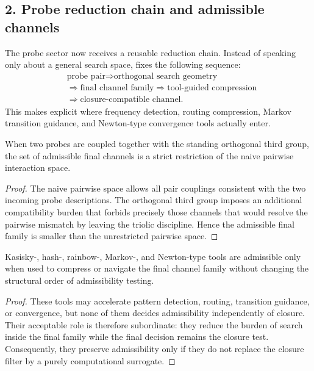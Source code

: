 \subsection*{2. Probe reduction chain and admissible channels}
The probe sector now receives a reusable reduction chain. Instead of speaking
only about a general search space,  fixes the following sequence:
\[
\begin{aligned}
&\text{probe pair}
\Longrightarrow \text{orthogonal search geometry}\\[0.15em]
&\Longrightarrow \text{final channel family}
\Longrightarrow \text{tool-guided compression}\\[0.15em]
&\Longrightarrow \text{closure-compatible channel}.
\end{aligned}
\]
This makes explicit where frequency detection, routing compression, Markov
transition guidance, and Newton-type convergence tools actually enter.

\begin{lemma}
\label{lem:probe-geometry-restricts}
When two probes are coupled together with the standing orthogonal third group,
the set of admissible final channels is a strict restriction of the naive
pairwise interaction space.
\end{lemma}

\begin{proof}
The naive pairwise space allows all pair couplings consistent with the two
incoming probe descriptions. The orthogonal third group imposes an additional
compatibility burden that forbids precisely those channels that would resolve
the pairwise mismatch by leaving the triolic discipline. Hence the admissible
final family is smaller than the unrestricted pairwise space.
\end{proof}

\begin{lemma}
\label{lem:tool-compression-order}
Kasisky-, hash-, rainbow-, Markov-, and Newton-type tools are admissible only
when used to compress or navigate the final channel family without changing
the structural order of admissibility testing.
\end{lemma}

\begin{proof}
These tools may accelerate pattern detection, routing, transition guidance, or
convergence, but none of them decides admissibility independently of closure.
Their acceptable role is therefore subordinate: they reduce the burden of
search inside the final family while the final decision remains the closure
test. Consequently, they preserve admissibility only if they do not replace the
closure filter by a purely computational surrogate.
\end{proof}

